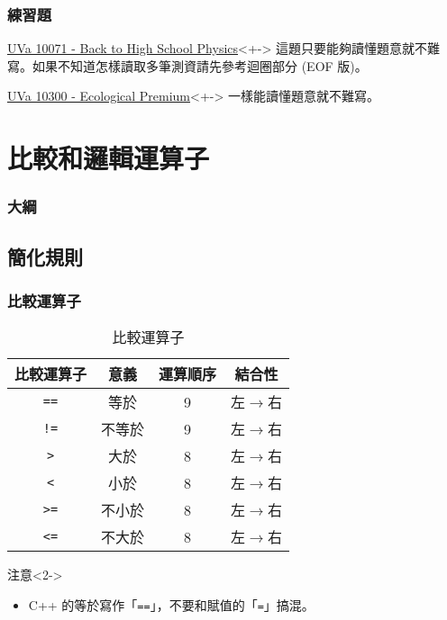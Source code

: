 \documentclass[utf8]{beamer}
\begin{document}
\begin{CJK}{UTF8}{bkai}
\begin{frame}
  \frametitle{練習題}
  \begin{exampleblock}{\href{http://unfortunate-dog.github.io/articles/100/p10071/}{UVa 10071 - Back to High School Physics}}<+->
  \label{uva:10071}
  這題只要能夠讀懂題意就不難寫。如果不知道怎樣讀取多筆測資請先參考迴圈部分 (EOF 版)。
  \end{exampleblock}
  \begin{exampleblock}{\href{http://unfortunate-dog.github.io/articles/103/p10300/}{UVa 10300 - Ecological Premium}}<+->
  \label{uva:10300}
  一樣能讀懂題意就不難寫。
  \end{exampleblock}
\end{frame}

\section{比較和邏輯運算子}
\begin{frame}
  \frametitle{大綱}
  \begin{multicols}{2}
    \tableofcontents[currentsection]
  \end{multicols}
\end{frame}

\subsection{簡化規則}

\begin{frame}[fragile]
  \frametitle{比較運算子}
  \begin{table}[h]
    \begin{tabular}{|c|c|c|c|}
    \hline
    比較運算子         & 意義   & 運算順序 & 結合性\\
    \hline
    \lstinline{==}{} & 等於   & 9       & 左$\rightarrow$右\\
    \hline
    \lstinline{!=}{} & 不等於 & 9       & 左$\rightarrow$右\\
    \hline
    \lstinline{>}{}  & 大於   & 8       & 左$\rightarrow$右\\
    \hline
    \lstinline{<}{}  & 小於   & 8       & 左$\rightarrow$右\\
    \hline
    \lstinline{>=}{} & 不小於 & 8       & 左$\rightarrow$右\\
    \hline
    \lstinline{<=}{} & 不大於 & 8       & 左$\rightarrow$右\\
    \hline
    \end{tabular}
    \caption{比較運算子}
  \end{table}
  \begin{alertblock}{注意}<2->
    \begin{itemize}
    \item C++ 的等於寫作「\lstinline{==}{}」，不要和賦值的「\lstinline{=}{}」搞混。
    \end{itemize}
  \end{alertblock}
\end{frame}


\end{CJK}
\end{document}
